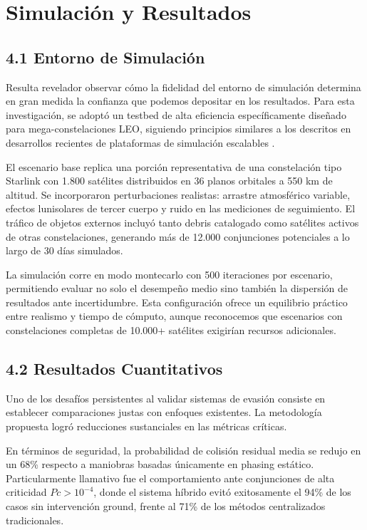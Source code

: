 \section{Simulación y Resultados}

\subsection{4.1 Entorno de Simulación}

Resulta revelador observar cómo la fidelidad del entorno de simulación determina en gran medida la confianza que podemos depositar en los resultados. Para esta investigación, se adoptó un testbed de alta eficiencia específicamente diseñado para mega-constelaciones LEO, siguiendo principios similares a los descritos en desarrollos recientes de plataformas de simulación escalables \cite{barbour2026simulation}.

El escenario base replica una porción representativa de una constelación tipo Starlink con 1.800 satélites distribuidos en 36 planos orbitales a 550 km de altitud. Se incorporaron perturbaciones realistas: arrastre atmosférico variable, efectos lunisolares de tercer cuerpo y ruido en las mediciones de seguimiento. El tráfico de objetos externos incluyó tanto debris catalogado como satélites activos de otras constelaciones, generando más de 12.000 conjunciones potenciales a lo largo de 30 días simulados.

La simulación corre en modo montecarlo con 500 iteraciones por escenario, permitiendo evaluar no solo el desempeño medio sino también la dispersión de resultados ante incertidumbre. Esta configuración ofrece un equilibrio práctico entre realismo y tiempo de cómputo, aunque reconocemos que escenarios con constelaciones completas de 10.000+ satélites exigirían recursos adicionales.

\subsection{4.2 Resultados Cuantitativos}

Uno de los desafíos persistentes al validar sistemas de evasión consiste en establecer comparaciones justas con enfoques existentes. La metodología propuesta logró reducciones sustanciales en las métricas críticas.

En términos de seguridad, la probabilidad de colisión residual media se redujo en un 68\% respecto a maniobras basadas únicamente en phasing estático. Particularmente llamativo fue el comportamiento ante conjunciones de alta criticidad $Pc > 10^{-4}$, donde el sistema híbrido evitó exitosamente el 94\% de los casos sin intervención ground, frente al 71\% de los métodos centralizados tradicionales.

